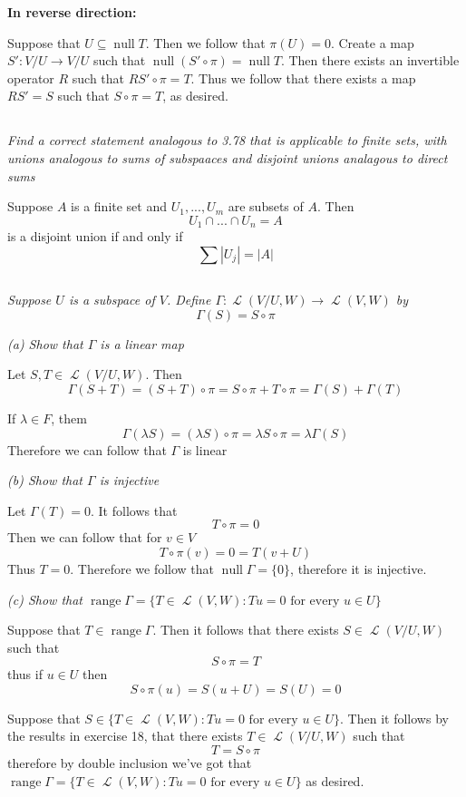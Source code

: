 \documentclass[11pt,oneside,titlepage]{book}
\DeclareMathOperator \map {\mathcal {L}}
\DeclareMathOperator \ns {null}
\DeclareMathOperator \range {range}
\begin{document}
\textbf{In reverse direction: }

Suppose that $U \subseteq \ns T$. Then we follow that $\pi(U) = 0$. Create a map
$S': V/U \to V/U$ such that $\ns (S' \circ \pi ) = \ns T$. Then there exists
an invertible operator $R$ such that $R S' \circ \pi = T$. Thus we follow that
there exists a map $RS' = S$ such that $S \circ \pi = T$, as desired.

\subsection{}

\textit{Find a correct statement analogous to 3.78 that is applicable to finite sets, with
  unions analogous to sums of subspaaces and disjoint unions analagous to direct sums }

Suppose $A$ is a finite set and $U_1, ..., U_m$ are subsets of $A$. Then
$$U_1 \cap ... \cap U_n = A$$
is a disjoint union if and only if
$$\sum |U_j| = |A|$$

\subsection{}

\textit{Suppose $U$ is a subspace of $V$. Define $\Gamma: \map(V/U, W) \to \map(V, W)$ by}
$$\Gamma(S) = S \circ \pi$$

\textit{(a) Show that $\Gamma$ is a linear map}

Let $S, T \in \map(V/U, W)$. Then
$$\Gamma(S + T) = (S + T) \circ \pi = S \circ \pi + T \circ \pi = \Gamma(S) + \Gamma(T)$$

If $\lambda \in F$, them
$$\Gamma(\lambda S) = (\lambda S) \circ \pi = \lambda S \circ \pi = \lambda \Gamma(S)$$
Therefore we can follow that $\Gamma$  is linear

\textit{(b) Show that $\Gamma$ is injective}

Let $\Gamma(T) = 0$. It follows that
$$T \circ \pi = 0$$
Then we can follow that for $v \in V$
$$T \circ \pi(v) = 0 = T(v + U)$$
Thus $T = 0$. Therefore we follow that $\ns \Gamma = \{0\}$, therefore it is injective.

\textit{(c) Show that $\range \Gamma = \{T \in \map(V, W): Tu = 0 \text{ for every } u \in U \}$}

Suppose that $T \in \range \Gamma$. Then it follows that there exists $S \in \map(V/U, W)$
such that
$$S \circ \pi = T$$
thus if $u \in U$ then
$$S \circ \pi (u) = S(u + U) = S(U) = 0$$

Suppose that $S \in \{T \in \map(V, W): Tu = 0 \text{ for every } u \in U \}$. Then
it follows by the results in exercise 18, that there exists $T \in \map(V/U, W)$ such
that
$$T = S \circ \pi$$
therefore by double inclusion we've got that 
$\range \Gamma = \{T \in \map(V, W): Tu = 0 \text{ for every } u \in U \}$
as desired.
\end{document}
